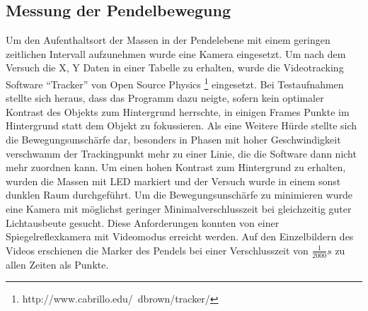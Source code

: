 \subsection{Messung der Pendelbewegung}
Um den Aufenthaltsort der Massen in der Pendelebene mit einem geringen zeitlichen Intervall aufzunehmen wurde eine Kamera eingesetzt. Um nach dem Versuch die X, Y Daten in einer Tabelle zu erhalten, wurde die Videotracking Software \enquote{Tracker} von Open Source Physics \footnote{http://www.cabrillo.edu/~dbrown/tracker/} eingesetzt.
Bei Testaufnahmen stellte sich heraus, dass das Programm dazu neigte, sofern kein optimaler Kontrast des Objekts zum Hintergrund herrschte, in einigen Frames Punkte im Hintergrund statt dem Objekt zu fokussieren. Als eine Weitere Hürde stellte sich die Bewegungsunschärfe dar, besonders in Phasen mit hoher Geschwindigkeit verschwamm der Trackingpunkt mehr zu einer Linie, die die Software dann nicht mehr zuordnen kann. Um einen hohen Kontrast zum Hintergrund zu erhalten, wurden die Massen mit LED markiert und der Versuch wurde in einem sonst dunklen Raum durchgeführt. Um die Bewegungsunschärfe zu minimieren wurde eine Kamera mit möglichst geringer Minimalverschlusszeit bei gleichzeitig guter Lichtausbeute gesucht. Diese Anforderungen konnten von einer Spiegelreflexkamera mit Videomodus erreicht werden. Auf den Einzelbildern des Videos erschienen die Marker des Pendels bei einer Verschlusszeit von $\frac{1}{2000} s$ zu allen Zeiten als Punkte.

